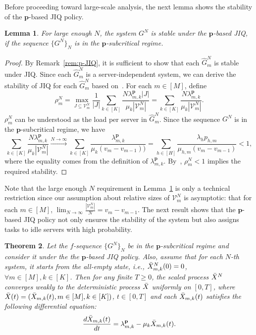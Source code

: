 \documentclass[11pt, reqno]{article}
\newtheorem{theorem}{Theorem}
\newtheorem{lemma}[theorem]{Lemma}
\numberwithin{equation}{section}
\numberwithin{theorem}{section}
\begin{document}
Before proceeding toward large-scale analysis, the next lemma shows the stability of the $\mathbf{p}$-based JIQ policy.
\begin{lemma}\label{lem:stable-p-JIQ}
    For large enough $N$, the system $G^N$ is stable under the $\mathbf{p}$-based JIQ, if the sequence $\{G^N\}_N$ is in the $\mathbf{p}$-subcritical regime.
\end{lemma} 
\begin{proof}
    By Remark~\ref{rem:p-JIQ}, it is sufficient to show that each $\hat{G}^N_m$ is stable under JIQ. Since each $\hat{G}^N_m$ is a server-independent system, we can derive the stability of JIQ for each $\hat{G}^N_m$ based on~\cite[Theorem~2.5]{FC98}. For each $m\in[M]$, define 
    \begin{equation}
        \rho^N_m=\max_{J\subseteq\mathcal{V}^N_m}\frac{1}{|J|}\sum_{k\in[K]}\frac{N\lambda^{\mathbf{p}}_{m,k}|J|}{\mu_k|\mathcal{V}^N_m|}=\sum_{k\in[K]}\frac{N\lambda^{\mathbf{p}}_{m,k}}{\mu_k|\mathcal{V}^N_m|}.
    \end{equation}
    $\rho^N_m$ can be understood as the load per server in $\hat{G}^N_m$. Since the sequence $G^N$ is in the $\mathbf{p}$-subcritical regime, we have 
    \begin{equation}
        \sum_{k\in[K]}\frac{N\lambda^{\mathbf{p}}_{m,k}}{\mu_k|\mathcal{V}^N_m|}\xrightarrow{N\rightarrow\infty}\sum_{k\in[K]}\frac{\lambda^{\mathbf{p}}_{m,k}}{\mu_k(v_m-v_{m-1}))}=\sum_{h\in[H]}\frac{\lambda_hp_{h,m}}{\mu_{h,m}(v_m-v_{m-1})}<1,
    \end{equation}
    where the equality comes from the definition of $\lambda^{\mathbf{p}}_{m,k}$. By~\cite[Theorem~2.5]{FC98}, $\rho^N_m<1$ implies the required stability. 
\end{proof}
Note that the large enough $N$ requirement in Lemma~\ref{lem:stable-p-JIQ} is only a technical restriction since our assumption about relative sizes of $\mathcal{V}^N_m$ is asymptotic: that for each $m\in[M]$, $\lim_{N\rightarrow\infty}\frac{|\mathcal{V}^N_m|}{N}=v_m-v_{m-1}$.
The next result shows that the $\mathbf{p}$-based JIQ policy not only ensures the stability of the system but also assigns tasks to idle servers with high probability.
\begin{theorem}\label{thm:fluid-limit-1}
Let the $f$-sequence $\{G^N\}_{N}$ be in the $\mathbf{p}$-subcritical regime and consider it under the the $\mathbf{p}$-based JIQ policy. 
Also, assume that for each $N$-th system, it starts from the all-empty state, i.e., $\Bar{X}^N_{m,k}(0)=0$, $\forall m\in[M], k\in[K]$. Then for any finite $T\geq 0$,  the scaled process $\Bar{X}^N$ converges weakly to the deterministic process $\Bar{X}$ uniformly on $[0,T]$,
where $\Bar{X}(t)=(\Bar{X}_{m,k}(t),m\in[M],k\in[K])$, $t\in[0,T]$ and each $\Bar{X}_{m,k}(t)$ satisfies the following differential equation: 
$$\frac{d \Bar{X}_{m,k}(t)}{dt}=\lambda^{\mathbf{p}}_{m,k}-\mu_k \Bar{X}_{m,k}(t).$$
\end{theorem}
\end{document}
